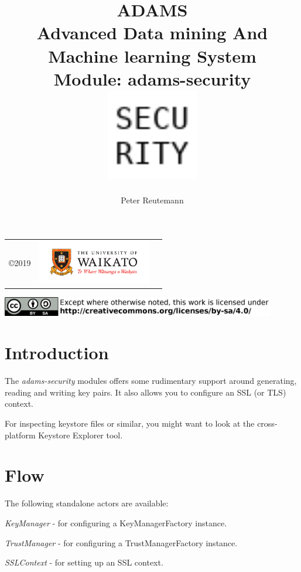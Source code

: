 \documentclass[a4paper]{book}
\title{
  \textbf{ADAMS} \\
  {\Large \textbf{A}dvanced \textbf{D}ata mining \textbf{A}nd \textbf{M}achine
  learning \textbf{S}ystem} \\
  {\Large Module: adams-security} \\
  \vspace{1cm}
  \includegraphics[width=4cm]{images/security-module.png} \\
}
\author{
  Peter Reutemann
}
\begin{document}
\begin{titlepage}
\maketitle

\thispagestyle{empty}
\center
\begin{table}[b]
	\begin{tabular}{c l l}
		\parbox[c][2cm]{2cm}{\copyright 2019} &
		\parbox[c][2cm]{5cm}{\includegraphics[width=5cm]{images/coat_of_arms.pdf}} \\
	\end{tabular}
	\includegraphics[width=12cm]{images/cc.png} \\
\end{table}

\end{titlepage}

\tableofcontents

\chapter{Introduction}
The \textit{adams-security} modules offers some rudimentary support around
generating, reading and writing key pairs. It also allows you to configure
an SSL (or TLS) context.

For inspecting keystore files or similar, you might want to look at the
cross-platform Keystore Explorer\cite{kse} tool.

\chapter{Flow}
\noindent The following standalone actors are available:
\begin{tight_itemize}
  \item \textit{KeyManager} - for configuring a KeyManagerFactory instance.
  \item \textit{TrustManager} - for configuring a TrustManagerFactory instance.
  \item \textit{SSLContext} - for setting up an SSL context.
\end{tight_itemize}
\end{document}
